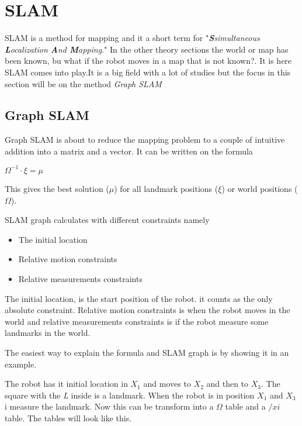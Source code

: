 \chapter{SLAM}
\label{chp:slam}

SLAM is a method for mapping and it a short term for "\emph{\textbf{S}simultaneous \textbf{L}ocalization \textbf{A}nd \textbf{M}apping}."
In the other theory sections the world or map has been known, bu what if the robot moves in a map that is not known?. It is here SLAM comes into play.It is a big field with a lot of studies but the focus in this section will be on the method \emph{Graph SLAM}

\section{Graph SLAM}

Graph SLAM is about to reduce the mapping problem to a couple of intuitive addition into a matrix and a vector.
It can be written on the formula

\begin{center}
	$\Omega^{-1} \cdot \xi = \mu$
\end{center}

This gives the best solution ($\mu$) for all landmark positions ($\xi$) or world positions ($\Omega$).

SLAM graph calculates with different constraints namely


\begin{itemize}
	\item The initial location
	\item Relative motion constraints
	\item Relative measurements constraints
\end{itemize}

The initial location, is the start position of the robot. it counts as the only absolute constraint. Relative motion constraints is when the robot moves in the world and relative measurements constraints is if the robot measure some landmarks in the world.

The easiest way to explain the formula and SLAM graph is by showing it in an example.

 
The robot has it initial location in $X_1$ and moves to $X_2$ and then to $X_3$. The square with the \emph{L} inside is a landmark. When the robot is in position $X_1$ and $X_3$ i measure the landmark.
Now this can be transform into a $\Omega$ table and a $/xi$ table. The tables will look like this.

